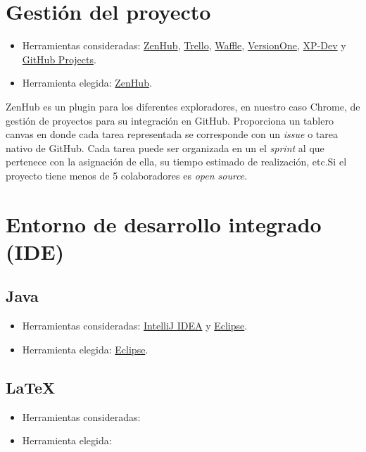 \section{Gestión del proyecto}\label{gestion-del-proyecto}

\begin{itemize}
	\tightlist
	\item
	Herramientas consideradas: \href{https://www.zenhub.com/}{ZenHub},
	\href{https://trello.com/}{Trello}, \href{https://waffle.io/}{Waffle},
	\href{https://www.versionone.com/}{VersionOne},
	\href{https://xp-dev.com/}{XP-Dev} y \href{https://github.com/}{GitHub
		Projects}.
	\item
	Herramienta elegida: \href{https://www.zenhub.com/}{ZenHub}.
\end{itemize}

ZenHub es un plugin para los diferentes exploradores, en nuestro caso Chrome, de gestión de proyectos para su integración
en GitHub. Proporciona un tablero canvas en donde cada tarea representada se corresponde con un \emph{issue} o tarea nativo de GitHub. Cada tarea puede ser organizada en un el \emph{sprint} al que pertenece con la asignación de ella, su tiempo estimado de realización, etc.Si el proyecto tiene menos de 5 colaboradores es \emph{open source}.


\section{Entorno de desarrollo integrado
	(IDE)}\label{entorno-de-desarrollo-integrado-ide}

\subsection{Java}\label{java}

\begin{itemize}
	\tightlist
	\item
	Herramientas consideradas:
	\href{https://www.jetbrains.com/idea/}{IntelliJ IDEA} y
	\href{https://eclipse.org/}{Eclipse}.
	\item
	Herramienta elegida: \href{https://eclipse.org/}{Eclipse}.
\end{itemize}



\subsection{LaTeX}\label{latex}

\begin{itemize}
	\tightlist
	\item
	Herramientas consideradas:
	\item
	Herramienta elegida:
\end{itemize}



